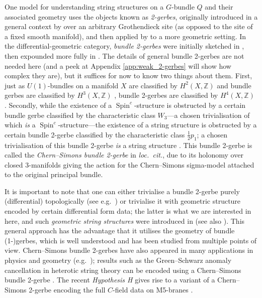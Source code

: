 \documentclass[12pt]{amsart}
\DeclareMathOperator{\Spin}{Spin}
\theoremstyle{plain}
\theoremstyle{definition}
\theoremstyle{remark}
\numberwithin{equation}{section}
\newcommand{\ZZ}{{\mathbb Z}}
\newcommand{\<}{\langle}
\renewcommand{\>}{\rangle}
\begin{document}
One model for understanding string structures on a $G$-bundle $Q$ and their associated geometry uses the objects known as \emph{2-gerbes}, originally introduced in a general context by \cite{Breen94} over an arbitrary Grothendieck site (as opposed to the site of a fixed smooth manifold), and then applied by \cite{BM} to a more geometric setting. 
In the differential-geometric category, \emph{bundle 2-gerbes} were initially sketched in \cite{Carey-Murray-Wang_97}, then expounded more fully in \cite{StevPhD,Ste}.
The details of general bundle 2-gerbes are not needed here (and a peek at Appendix \ref{app:weak_2-gerbes} will show how complex they are), but it suffices for now to know two things about them.
First, just as $U(1)$-bundles on a manifold $X$ are classified by $H^2(X,\ZZ)$ and bundle gerbes are classified by $H^3(X,\ZZ)$ \cite{Mur}, bundle 2-gerbes are classified by $H^4(X,\ZZ)$ \cite{Ste}.
Secondly, while the existence of a $\Spin^c$-structure is obstructed by a certain bundle gerbe classified by the characteristic class $W_3$---a chosen trivialisation of which \emph{is} a $\Spin^c$-structure---the existence of a string structure is obstructed by a certain bundle 2-gerbe classified by the characteristic class $\frac{1}{2} p_1$; a chosen trivialisation of this bundle 2-gerbe \emph{is} a string structure \cite{JohnsonPhD,CJMSW}.
This bundle 2-gerbe is called the \emph{Chern--Simons bundle 2-gerbe} in \emph{loc.\ cit.}, due to its holonomy over closed 3-manifolds giving the action for the Chern--Simons sigma-model attached to the original principal bundle.

It is important to note that one can either trivialise a bundle 2-gerbe purely (differential) topologically (see e.g.\ \cite{BM,Stolz-Teichner}) or trivialise it with geometric structure encoded by certain differential form data; the latter is what we are interested in here, and such \emph{geometric string structures} were introduced in \cite{Wal} (see also \cite{FiorenzaSatiSchreiber_14}).
This general approach has the advantage that it utilises the geometry of bundle (1-)gerbes, which is well understood and has been studied from multiple points of view. 
Chern--Simons bundle 2-gerbes have also appeared in many applications in physics and geometry (e.g.\ \cite{CJMSW,CareyWang_08,Sati_10,Wal,FiorenzaSatiSchreiber_14,Mickler_18}); results such as the Green--Schwarz anomaly cancellation in heterotic string theory can be encoded using a Chern--Simons bundle 2-gerbe \cite{Sati-Schreiber-Stasheff_12,Fiorenza-Sati-Schreiber_15}. 
The recent \emph{Hypothesis H} \cite{Fiorenza-Sati-Schreiber_20,Fiorenza-Sati-Schreiber_21b} gives rise to a variant of a Chern--Simons 2-gerbe encoding the full $C$-field data on M5-branes \cite{Fiorenza-Sati-Schreiber_21a}. 
\end{document}
